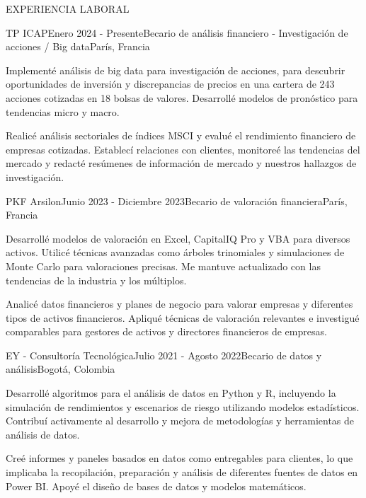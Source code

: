 \documentclass{resume} %
\begin{document}
%
%

\begin{rSection}{EXPERIENCIA LABORAL}

\vspace{0.3em}
\begin{rSubsection}{TP ICAP}{Enero 2024 - Presente}{Becario de análisis financiero - Investigación de acciones / Big data}{París, Francia}
    \item Implementé análisis de big data para investigación de acciones, para descubrir oportunidades de inversión y discrepancias de precios en una cartera de 243 acciones cotizadas en 18 bolsas de valores. Desarrollé modelos de pronóstico para tendencias micro y macro.
    \item Realicé análisis sectoriales de índices MSCI y evalué el rendimiento financiero de empresas cotizadas. Establecí relaciones con clientes, monitoreé las tendencias del mercado y redacté resúmenes de información de mercado y nuestros hallazgos de investigación.
\end{rSubsection}

\begin{rSubsection}{PKF Arsilon}{Junio 2023 - Diciembre 2023}{Becario de valoración financiera}{París, Francia}
    \item Desarrollé modelos de valoración en Excel, CapitalIQ Pro y VBA para diversos activos. Utilicé técnicas avanzadas como árboles trinomiales y simulaciones de Monte Carlo para valoraciones precisas. Me mantuve actualizado con las tendencias de la industria y los múltiplos.
    \item Analicé datos financieros y planes de negocio para valorar empresas y diferentes tipos de activos financieros. Apliqué técnicas de valoración relevantes e investigué comparables para gestores de activos y directores financieros de empresas.
\end{rSubsection}

\begin{rSubsection}{EY - Consultoría Tecnológica}{Julio 2021 - Agosto 2022}{Becario de datos y análisis}{Bogotá, Colombia}
    \item Desarrollé algoritmos para el análisis de datos en Python y R, incluyendo la simulación de rendimientos y escenarios de riesgo utilizando modelos estadísticos. Contribuí activamente al desarrollo y mejora de metodologías y herramientas de análisis de datos.
    \item Creé informes y paneles basados en datos como entregables para clientes, lo que implicaba la recopilación, preparación y análisis de diferentes fuentes de datos en Power BI. Apoyé el diseño de bases de datos y modelos matemáticos.
\end{rSubsection}
\end{rSection}
\end{document}
